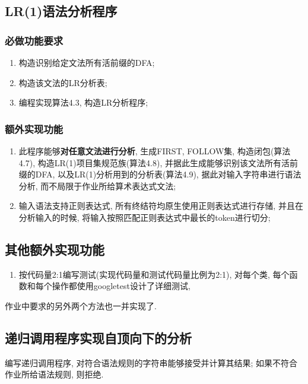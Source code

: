 \subsection{LR(1)语法分析程序}
\subsubsection{必做功能要求}
\begin{enumerate}
	\item 构造识别给定文法所有活前缀的DFA;
	\item 构造该文法的LR分析表;
	\item 编程实现算法4.3, 构造LR分析程序;
\end{enumerate}

\subsubsection{额外实现功能}
\begin{enumerate}
	\item 此程序能够\textbf{对任意文法进行分析}, 生成FIRST, FOLLOW集,
	      构造闭包(算法4.7), 构造LR(1)项目集规范族(算法4.8),
	      并据此生成能够识别该文法所有活前缀的DFA,
	      以及LR(1)分析用到的分析表(算法4.9),
	      据此对输入字符串进行语法分析, 而不局限于作业所给算术表达式文法;
	\item 输入语法支持正则表达式, 所有终结符均原生使用正则表达式进行存储,
	      并且在分析输入的时候, 将输入按照匹配正则表达式中最长的token进行切分;
\end{enumerate}

\subsection{其他额外实现功能}
\begin{enumerate}
	\item 按代码量2:1编写测试(实现代码量和测试代码量比例为2:1), 对每个类,
	      每个函数和每个操作都使用googletest设计了详细测试,
\end{enumerate}

作业中要求的另外两个方法也一并实现了.

\subsection{递归调用程序实现自顶向下的分析}
编写递归调用程序, 对符合语法规则的字符串能够接受并计算其结果;
如果不符合作业所给语法规则, 则拒绝.
